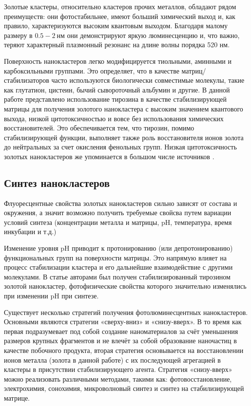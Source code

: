 \documentclass[a4paper, 12pt]{article}
\begin{document}
\begin{onehalfspace}
	Золотые кластеры, относительно кластеров прочих металлов, обладают рядом преимуществ: они фотостабильнее, имеют больший химический выход и, как правило, характеризуются высоким квантовым выходом.
	Благодаря малому размеру в $0.5 - 2~\text{нм}$ они демонстрируют яркую люминесценцию и, что важно, теряют характерный плазмонный резонанс на длине волны порядка 520 нм.

	Поверхность нанокластеров легко модифицируется тиольными, аминными и карбоксильными группами.
	Это определяет, что в качестве матриц\-/стабилизаторов часто используются биологически совместимые молекулы, такие как глутатион, цистеин, бычий сывороточный альбумин и другие.
	В данной работе представлено использование тирозина в качестве стабилизирующей матрицы для получения золотого нанокластера с высоким значением квантового выхода, низкой цитотоксичностью и вовсе без использования химических восстановителей.
	Это обеспечивается тем, что тирозин, помимо стабилизирующей функции, выполняет также роль восстановителя ионов золота до нейтральных за счет окисления фенольных групп.
	Низкая цитотоксичность золотых нанокластеров же упоминается в большом числе источников \cite{https://doi.org/10.1002/smll.201403481}.


	\subsection*{Синтез нанокластеров}

	Флуоресцентные свойства золотых нанокластеров сильно зависят от состава и окружения, а значит возможно получить требуемые свойсва путем вариации условий синтеза (концентрации металла и матрицы, pH, температура, время инкубации и т.д.)

	Изменение уровня pH приводит к протонированию (или депротонированию) функциональных групп на поверхности матрицы.
	Это напрямую влияет на процесс стабилизации кластера и его дальнейшие взаимодействие с другими молекулами.
	В статье \cite{sych:2024} авторами был получен стабилизированный тирозином золотой нанокластер, фотофизические свойства которого значительно изменялись при изменении pH при синтезе.

	Существует несколько стратегий получения фотолюминесцентных нанокластеров. Основными являются стратегии «сверху-вниз» и «снизу-вверх».
	В то время как первая подразумевает под собой создание наноматериалов за счёт уменьшения размеров крупных фрагментов и не влечёт за собой образование наночастиц в качестве побочного продукта, вторая стратегия основывается на восстановлении ионов металла (золота в данной работе) с их последующей агрегацией в кластеры в присутствии стабилизирующего агента.
	Стратегия «снизу-вверх» можно реализовать различными методами, такими как: фотовосстановление, электрохимия, сонохимия, микроволновый синтез и синтез на стабилизирующей матрице.


\end{onehalfspace}
\end{document}
